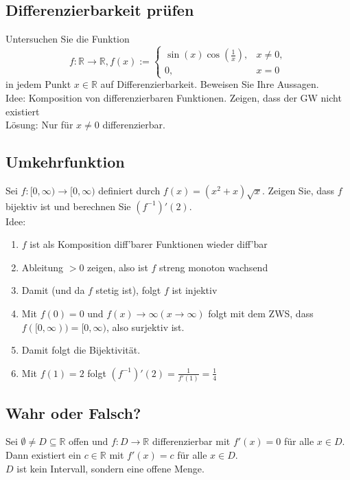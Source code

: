 \subsection{Differenzierbarkeit prüfen}
Untersuchen Sie die Funktion
\begin{displaymath}
  f:\mathbb{R} \to \mathbb{R}, f(x) :=
  \begin{cases}
    \sin(x)\cos\left(\frac{1}{x}\right),& x \neq 0,\\
    0,& x = 0
  \end{cases}
\end{displaymath}
in jedem Punkt $x \in \mathbb{R}$ auf Differenzierbarkeit.
Beweisen Sie Ihre Aussagen.\\
Idee: Komposition von differenzierbaren Funktionen. Zeigen, dass der GW nicht existiert\\
Lösung: Nur für $x \neq 0$ differenzierbar.

\subsection{Umkehrfunktion}
Sei $f: [0,\infty) \to [0,\infty)$ definiert durch $f(x) = (x^2 + x)\sqrt{x}$.
Zeigen Sie, dass $f$ bijektiv ist und berechnen Sie $(f^{-1})'(2)$.\\
Idee:
\begin{enumerate}
    \item $f$ ist als Komposition diff'barer Funktionen wieder diff'bar
    \item Ableitung $> 0$ zeigen, also ist $f$ streng monoton wachsend
    \item Damit (und da $f$ stetig ist), folgt $f$ ist injektiv
    \item Mit $f(0) = 0$ und $f(x) \to \infty (x \to \infty)$ folgt mit dem ZWS, dass $f([0,\infty)) = [0,\infty)$, also surjektiv ist.
    \item Damit folgt die Bijektivität.
    \item Mit $f(1) = 2$ folgt $(f^{-1})'(2) = \frac{1}{f'(1)} = \frac{1}{4}$
\end{enumerate}

\subsection{Wahr oder Falsch?}
Sei $\emptyset \neq D \subseteq \mathbb{R}$ offen und $f:D \to \mathbb{R}$ differenzierbar mit $f'(x) = 0$ für alle $x \in D$. 
Dann existiert ein $c \in \mathbb{R}$ mit $f'(x) = c$ für alle $x \in D$.\\
$D$ ist kein Intervall, sondern eine offene Menge.

